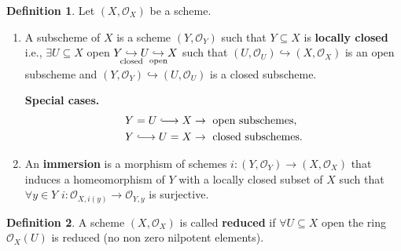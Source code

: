\documentclass[12pt]{article}
\theoremstyle{definition}
\newtheorem*{definition}{Definition}
\theoremstyle{remark}
\begin{document}
\begin{definition}
Let $(X,\mathcal{O}_X)$ be a scheme.

\begin{enumerate}[label=\arabic*)]
\item A subscheme of $X$ is a scheme $(Y,\mathcal{O}_Y)$ such that $Y\subseteq X$ is \textbf{locally closed} i.e., $\exists U\subseteq X$ open $Y\underset{\mathclap{\text{closed}}}{\hookrightarrow}U\underset{\mathclap{\text{open}}}{\hookrightarrow}X$ such that $(U,\mathcal{O}_U)\hookrightarrow(X,\mathcal{O}_X)$ is an open subscheme and $(Y,\mathcal{O}_Y)\hookrightarrow(U,\mathcal{O}_U)$ is a closed subscheme.

\textbf{Special cases.}
\begin{align*}
Y=U\lhook\joinrel\longrightarrow X&\rightarrow\text{ open subschemes},\\
Y\lhook\joinrel\longrightarrow U=X&\rightarrow\text{ closed subschemes}.
\end{align*}

\item An \textbf{immersion} is a morphism of schemes $i:(Y,\mathcal{O}_Y)\rightarrow(X,\mathcal{O}_X)$ that induces a homeomorphism of $Y$ with a locally closed subset of $X$ such that $\forall y\in Y$ $i:\mathcal{O}_{X,i(y)}\rightarrow\mathcal{O}_{Y,y}$ is surjective.
\end{enumerate}
\end{definition}

\begin{definition}
A scheme $(X,\mathcal{O}_X)$ is called \textbf{reduced} if $\forall U\subseteq X$ open the ring $\mathcal{O}_X(U)$ is reduced (no non zero nilpotent elements).
\end{definition}
\end{document}

